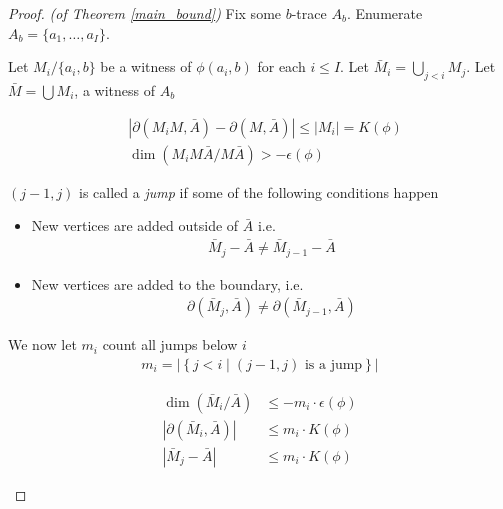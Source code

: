 \documentclass{amsart}
\newcommand{\curly}[1]{\left\{#1\right\}}
\newcommand{\abs}[1]{\left|#1\right|}
\begin{document}
\begin{proof} \textit{(of Theorem \ref{main_bound})}
	Fix some $b$-trace $A_b$. Enumerate $A_b = \{a_1, \ldots, a_I\}$.

	Let $M_i / \{a_i, b\}$ be a witness of $\phi(a_i, b)$ for each $i \leq I$.
	Let $\bar M_i = \bigcup_{j < i} M_j$.
	Let $\bar M = \bigcup M_i$, a witness of $A_b$
	
	\begin{Claim}
		\begin{align*}
			&\abs{\partial(M_i M, \bar A) - \partial(M, \bar A)} \leq |M_i| = K(\phi)\\
			&\dim(M_i M \bar A / M \bar A) > -\epsilon(\phi)
		\end{align*}
	\end{Claim}
	
	\begin{Definition}
		$(j-1, j)$ is called a \emph{jump} if some of the following conditions happen
		\begin{itemize}
			\item New vertices are added outside of $\bar A$ i.e.
				\begin{align*}
					\bar M_j - \bar A \neq \bar M_{j-1} - \bar A
				\end{align*}
			\item New vertices are added to the boundary, i.e.
				\begin{align*}
					\partial(\bar M_j, \bar A) \neq \partial(\bar M_{j-1}, \bar A)
				\end{align*}
		\end{itemize}
	\end{Definition}

	\begin{Definition}
		We now let $m_i$ count all jumps below $i$
		\begin{align*}
			m_i = \abs{\curly{j < i \mid (j-1, j) \text{ is a jump}}}
		\end{align*}
	\end{Definition}

	\begin{Lemma} \label{ub_lemma}
		\begin{align*}
			\dim(\bar M_i / \bar A) &\leq -m_i \cdot \epsilon(\phi) \\
			|\partial(\bar M_i, \bar A)| &\leq m_i \cdot K(\phi) \\
			|\bar M_j - \bar A| &\leq m_i \cdot K(\phi)
		\end{align*}
	\end{Lemma}


\end{proof}
\end{document}
